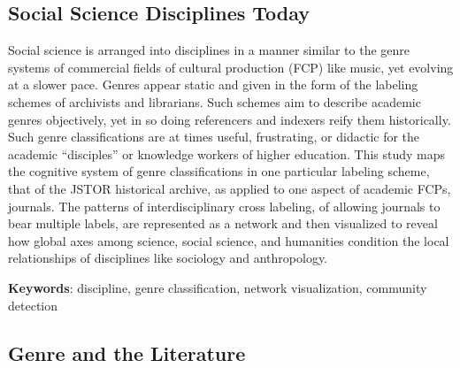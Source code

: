 \documentclass[]{book}
\theoremstyle{definition}
\theoremstyle{definition}
\theoremstyle{definition}
\theoremstyle{remark}
\begin{document}
\hypertarget{social-science-disciplines-today}{%
\subsection*{Social Science Disciplines
Today}\label{social-science-disciplines-today}}


















Social science is arranged into disciplines in a manner
similar to the genre systems of commercial fields of cultural production
(FCP) like music, yet evolving at a slower pace. Genres appear static
and given in the form of the labeling schemes of archivists and
librarians. Such schemes aim to describe academic genres objectively,
yet in so doing referencers and indexers reify them historically. Such
genre classifications are at times useful, frustrating, or didactic for
the academic ``disciples'' or knowledge workers of higher education.
This study maps the cognitive system of genre classifications in one
particular labeling scheme, that of the JSTOR historical archive, as
applied to one aspect of academic FCPs, journals. The patterns of
interdisciplinary cross labeling, of allowing journals to bear multiple
labels, are represented as a network and then visualized to reveal how
global axes among science, social science, and humanities condition the
local relationships of disciplines like sociology and anthropology.




\textbf{Keywords}: discipline, genre classification, network visualization,
community detection

\hypertarget{genre-and-the-literature}{%
\subsection*{Genre and the Literature}\label{genre-and-the-literature}}
\end{document}
